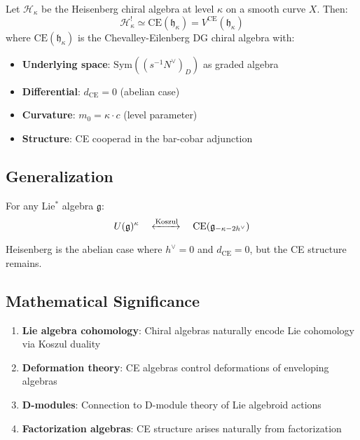 \begin{theorem}
Let $\mathcal{H}_\kappa$ be the Heisenberg chiral algebra at level $\kappa$ on a smooth curve $X$. Then:
$$\mathcal{H}_\kappa^! \simeq \text{CE}(\mathfrak{h}_\kappa) = V^{\text{CE}}(\mathfrak{h}_\kappa)$$
where $\text{CE}(\mathfrak{h}_\kappa)$ is the Chevalley-Eilenberg DG chiral algebra with:
\begin{itemize}
\item \textbf{Underlying space}: $\text{Sym}((s^{-1}N^\vee)_D)$ as graded algebra
\item \textbf{Differential}: $d_{\text{CE}} = 0$ (abelian case)
\item \textbf{Curvature}: $m_0 = \kappa \cdot c$ (level parameter)
\item \textbf{Structure}: CE cooperad in the bar-cobar adjunction
\end{itemize}


\end{theorem}


\subsection{Generalization}

For any Lie$^*$ algebra $\mathfrak{g}$:
$$U(\mathfrak{g})^\kappa \quad \xleftrightarrow{\text{Koszul}} \quad \text{CE}(\mathfrak{g}_{-\kappa-2h^\vee})$$

Heisenberg is the abelian case where $h^\vee = 0$ and $d_{\text{CE}} = 0$, but the CE structure remains.


\subsection{Mathematical Significance}

\begin{enumerate}
\item \textbf{Lie algebra cohomology}: Chiral algebras naturally encode Lie cohomology via Koszul duality
\item \textbf{Deformation theory}: CE algebras control deformations of enveloping algebras
\item \textbf{D-modules}: Connection to D-module theory of Lie algebroid actions
\item \textbf{Factorization algebras}: CE structure arises naturally from factorization
\end{enumerate}



